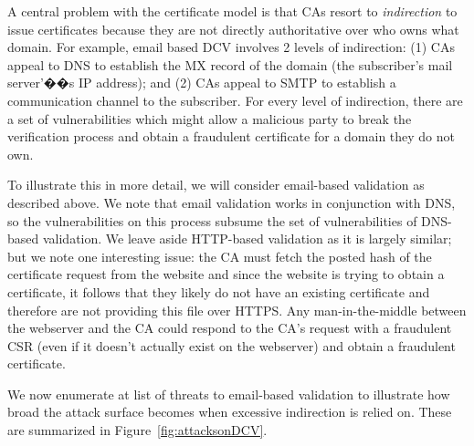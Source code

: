 A central problem with the certificate model is that CAs resort to \textit{indirection} to issue certificates because they are not directly authoritative over who owns what domain. For example, email based DCV involves 2 levels of indirection: (1) CAs appeal to DNS to establish the MX record of the domain (\ie the subscriber's mail server'��s IP address); and (2) CAs appeal to SMTP to establish a communication channel to the subscriber. For every level of indirection, there are a set of vulnerabilities which might allow a malicious party to break the verification process and obtain a fraudulent certificate for a domain they do not own.

To illustrate this in more detail, we will consider email-based validation as described above. We note that email validation works in conjunction with DNS, so the vulnerabilities on this process subsume the set of vulnerabilities of DNS-based validation. We leave aside HTTP-based validation as it is largely similar; but we note one interesting issue: the CA must fetch the posted hash of the certificate request from the website and since the website is trying to obtain a certificate, it follows that they likely do not have an existing certificate and therefore are not providing this file over HTTPS. Any man-in-the-middle between the webserver and the CA could respond to the CA's request with a fraudulent CSR (even if it doesn't actually exist on the webserver) and obtain a fraudulent certificate. 

We now enumerate at list of threats to email-based validation to illustrate how broad the attack surface becomes when excessive indirection is relied on. These are summarized in Figure~\ref{fig:attacksonDCV}.

